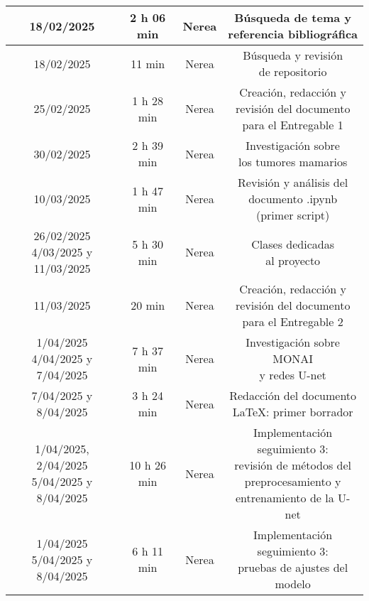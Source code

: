 \documentclass[12pt]{article}
\begin{document}
\begin{longtable}{|c|c|c|c|}
18/02/2025 & 2 h 06 min & Nerea & \makecell{Búsqueda de tema y \\ referencia bibliográfica} \\
\hline
18/02/2025 & 11 min & Nerea & \makecell{Búsqueda y revisión \\ de repositorio} \\
\hline
25/02/2025 & 1 h 28 min & Nerea & \makecell{Creación, redacción y \\ revisión del documento \\ para el Entregable 1} \\
\hline
30/02/2025 & 2 h 39 min & Nerea & \makecell{Investigación sobre \\ los tumores mamarios} \\
\hline
10/03/2025 & 1 h 47 min & Nerea & \makecell{Revisión y análisis del \\ documento .ipynb \\ (primer script)} \\
\hline
\makecell{26/02/2025 \\ 4/03/2025 y 11/03/2025} & 5 h 30 min & Nerea & \makecell{Clases dedicadas \\ al proyecto} \\
\hline
11/03/2025 & 20 min & Nerea & \makecell{Creación, redacción y \\ revisión del documento \\ para el Entregable 2} \\
\hline
\makecell{1/04/2025 \\ 4/04/2025 y 7/04/2025} & 7 h 37 min & Nerea & \makecell{Investigación sobre MONAI \\ y redes U-net} \\
\hline
7/04/2025 y 8/04/2025 & 3 h 24 min & Nerea & \makecell{Redacción del documento \\ LaTeX: primer borrador} \\
\hline
\makecell{1/04/2025, \\ 2/04/2025 \\ 5/04/2025 y \\ 8/04/2025} & 10 h 26 min & Nerea & \makecell{Implementación seguimiento 3: \\ revisión de métodos del \\ preprocesamiento y \\ entrenamiento de la U-net} \\
\hline
\makecell{1/04/2025 \\ 5/04/2025 y 8/04/2025} & 6 h 11 min & Nerea & \makecell{Implementación seguimiento 3: \\ pruebas de ajustes del modelo} \\

\end{longtable}
\end{document}
